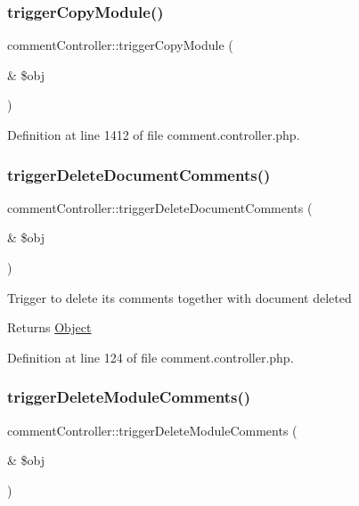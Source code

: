 \subsubsection{\texorpdfstring{trigger\+Copy\+Module()}{triggerCopyModule()}}
{\footnotesize\ttfamily comment\+Controller\+::trigger\+Copy\+Module (\begin{DoxyParamCaption}\item[{\&}]{\$obj }\end{DoxyParamCaption})}



Definition at line 1412 of file comment.\+controller.\+php.

\hypertarget{classcommentController_ab209ef386bfb83c88a85bf4618237aca}{}\label{classcommentController_ab209ef386bfb83c88a85bf4618237aca} 
\subsubsection{\texorpdfstring{trigger\+Delete\+Document\+Comments()}{triggerDeleteDocumentComments()}}
{\footnotesize\ttfamily comment\+Controller\+::trigger\+Delete\+Document\+Comments (\begin{DoxyParamCaption}\item[{\&}]{\$obj }\end{DoxyParamCaption})}

Trigger to delete its comments together with document deleted \begin{DoxyReturn}{Returns}
\hyperlink{classObject}{Object} 
\end{DoxyReturn}


Definition at line 124 of file comment.\+controller.\+php.

\hypertarget{classcommentController_a8c9ad7337a8522f82a4010f9f0afa274}{}\label{classcommentController_a8c9ad7337a8522f82a4010f9f0afa274} 
\subsubsection{\texorpdfstring{trigger\+Delete\+Module\+Comments()}{triggerDeleteModuleComments()}}
{\footnotesize\ttfamily comment\+Controller\+::trigger\+Delete\+Module\+Comments (\begin{DoxyParamCaption}\item[{\&}]{\$obj }\end{DoxyParamCaption})}

